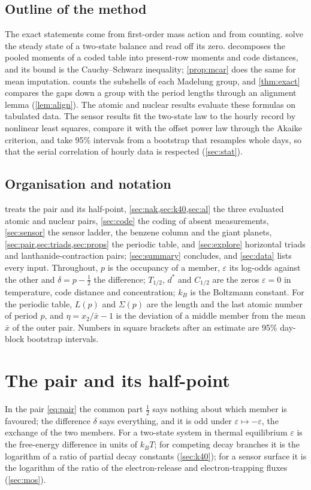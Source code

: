 \documentclass[11pt]{article}
\theoremstyle{definition}\newtheorem{definition}[theorem]{Definition}
\theoremstyle{remark}\newtheorem{remark}[theorem]{Remark}
\begin{document}
\subsection{Outline of the method}
The exact statements come from first-order mass action and from counting.  solve the steady state of a two-state balance and read off its zero.  decomposes the pooled moments of a coded table into present-row moments and code distances, and its bound is the Cauchy--Schwarz inequality; \cref{prop:mcar} does the same for mean imputation.  counts the subshells of each Madelung group, and \cref{thm:exact} compares the gaps down a group with the period lengths through an alignment lemma (\cref{lem:align}). The atomic and nuclear results evaluate these formulas on tabulated data. The sensor results fit the two-state law to the hourly record by nonlinear least squares, compare it with the offset power law through the Akaike criterion, and take 95\% intervals from a bootstrap that resamples whole days, so that the serial correlation of hourly data is respected (\cref{sec:stat}).

\subsection{Organisation and notation}
 treats the pair and its half-point, \cref{sec:nak,sec:k40,sec:al} the three evaluated atomic and nuclear pairs, \cref{sec:code} the coding of absent measurements, \cref{sec:sensor} the sensor ladder, the benzene column and the giant planets, \cref{sec:pair,sec:triads,sec:props} the periodic table, and \cref{sec:explore} horizontal triads and lanthanide-contraction pairs; \cref{sec:summary} concludes, and \cref{sec:data} lists every input. Throughout, $p$ is the occupancy of a member, $\varepsilon$ its log-odds against the other and $\delta=p-\frac12$ the difference; $T_{1/2}$, $d^*$ and $C_{1/2}$ are the zeros $\varepsilon=0$ in temperature, code distance and concentration; $k_B$ is the Boltzmann constant. For the periodic table, $L(p)$ and $\Sigma(p)$ are the length and the last atomic number of period $p$, and $\eta=x_2/\bar x-1$ is the deviation of a middle member from the mean $\bar x$ of the outer pair. Numbers in square brackets after an estimate are 95\% day-block bootstrap intervals.

\section{The pair and its half-point}\label{sec:half}
In the pair \eqref{eq:pair} the common part $\frac12$ says nothing about which member is favoured; the difference $\delta$ says everything, and it is odd under $\varepsilon\mapsto-\varepsilon$, the exchange of the two members. For a two-state system in thermal equilibrium $\varepsilon$ is the free-energy difference in units of $k_BT$; for competing decay branches it is the logarithm of a ratio of partial decay constants (\cref{sec:k40}); for a sensor surface it is the logarithm of the ratio of the electron-release and electron-trapping fluxes (\cref{sec:mos}).
\end{document}

